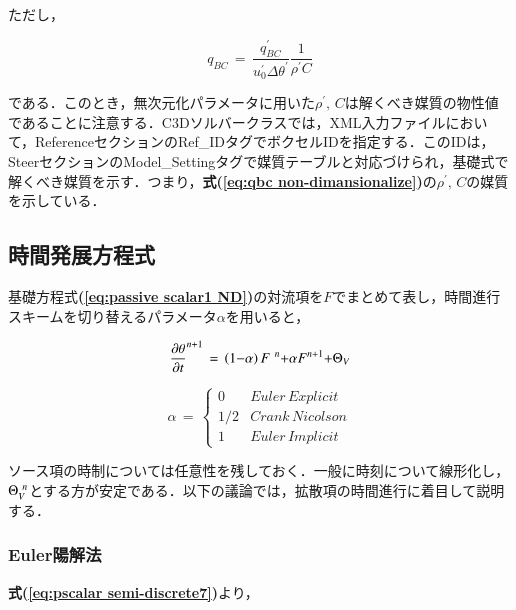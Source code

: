 \noindent ただし，

\begin{equation}
{q}_{BC} \,=\,\frac{q_{BC}^{\prime}} {u_{\mathit{0}}^{\prime} \Delta \theta^{\prime}} \frac{1}{\rho^{\prime}C}
\label{eq:qbc non-dimansionalize}
\end{equation}

である．このとき，無次元化パラメータに用いた$\rho^{\prime},\,C$は解くべき媒質の物性値であることに注意する．C3Dソルバークラスでは，XML入力ファイルにおいて，ReferenceセクションのRef\_IDタグでボクセルIDを指定する．このIDは，SteerセクションのModel\_Settingタグで媒質テーブルと対応づけられ，基礎式で解くべき媒質を示す．つまり，\textbf{式(\ref{eq:qbc non-dimansionalize})}の$\rho^{\prime},\,C$の媒質を示している．


%
\subsection{時間発展方程式}
基礎方程式\textbf{(\ref{eq:passive scalar1 ND})}の対流項を$F$でまとめて表し，時間進行スキームを切り替えるパラメータ$\alpha$を用いると，

\begin{equation}
{\frac{\partial \theta}{\partial t}}^{n+1}
\,=\,
\left({{1}\mathrm{{-}}\mathit{\alpha}}\right){F}^{\hspace{0.33em}{n}}\mathrm{{+}}\mathit{\alpha}{F}^{{n}\mathrm{{+}}{1}}\mathrm{{+}}{\mathrm{\Theta}}_{V}
\label{eq:pscalar evolv2}
\end{equation}

\begin{equation}
\alpha\,=\, \left\{
\begin{array}{cl}
0 & Euler\, Explicit\\
1/2 & Crank\, Nicolson\\
1 & Euler\, Implicit
\end{array} \right.
\label{eq:pscalar evolv3}
\end{equation}

\noindent ソース項の時制については任意性を残しておく．一般に時刻について線形化し，$\Theta_{V}^{\hspace{0.3em}n}$とする方が安定である．以下の議論では，拡散項の時間進行に着目して説明する．

%
\subsubsection{Euler陽解法}

\textbf{式(\ref{eq:pscalar semi-discrete7})}より，

